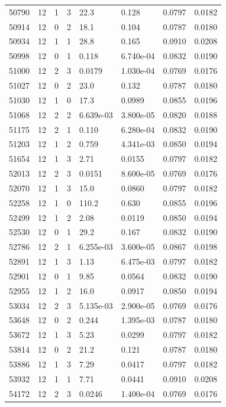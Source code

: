 \documentclass[preview]{standalone}
\begin{document}
{{{\begin{tabular}{L{1.2cm}C{1.2cm} C{0.3cm}C{0.5cm} C{1.4cm}C{1.4cm} C{1.4cm}C{1.4cm}}
  50790  &    12  & 1     &  3 &  22.3  & 0.128  & 0.0797 &  0.0182   \\ 
  50914  &    12  & 0     &  2 &  18.1  & 0.104  & 0.0787 &  0.0180   \\ 
  50934  &    12  & 1     &  1 &  28.8  & 0.165  & 0.0910 &  0.0208   \\ 
  50998  &    12  & 0     &  1 &  0.118  & 6.740e-04  & 0.0832 &  0.0190   \\ 
  51000  &    12  & 2     &  3 &  0.0179  & 1.030e-04  & 0.0769 &  0.0176   \\ 
  51027  &    12  & 0     &  2 &  23.0  & 0.132  & 0.0787 &  0.0180   \\ 
  51030  &    12  & 1     &  0 &  17.3  & 0.0989  & 0.0855 &  0.0196   \\ 
  51068  &    12  & 2     &  2 &  6.639e-03  & 3.800e-05  & 0.0820 &  0.0188   \\ 
  51175  &    12  & 2     &  1 &  0.110  & 6.280e-04  & 0.0832 &  0.0190   \\ 
  51203  &    12  & 1     &  2 &  0.759  & 4.341e-03  & 0.0850 &  0.0194   \\ 
  51654  &    12  & 1     &  3 &  2.71  & 0.0155  & 0.0797 &  0.0182   \\ 
  52013  &    12  & 2     &  3 &  0.0151  & 8.600e-05  & 0.0769 &  0.0176   \\ 
  52070  &    12  & 1     &  3 &  15.0  & 0.0860  & 0.0797 &  0.0182   \\ 
  52258  &    12  & 1     &  0 &  110.2  & 0.630  & 0.0855 &  0.0196   \\ 
  52499  &    12  & 1     &  2 &  2.08  & 0.0119  & 0.0850 &  0.0194   \\ 
  52530  &    12  & 0     &  1 &  29.2  & 0.167  & 0.0832 &  0.0190   \\ 
  52786  &    12  & 2     &  1 &  6.255e-03  & 3.600e-05  & 0.0867 &  0.0198   \\ 
  52891  &    12  & 1     &  3 &  1.13  & 6.475e-03  & 0.0797 &  0.0182   \\ 
  52901  &    12  & 0     &  1 &  9.85  & 0.0564  & 0.0832 &  0.0190   \\ 
  52955  &    12  & 1     &  2 &  16.0  & 0.0917  & 0.0850 &  0.0194   \\ 
  53034  &    12  & 2     &  3 &  5.135e-03  & 2.900e-05  & 0.0769 &  0.0176   \\ 
  53648  &    12  & 0     &  2 &  0.244  & 1.395e-03  & 0.0787 &  0.0180   \\ 
  53672  &    12  & 1     &  3 &  5.23  & 0.0299  & 0.0797 &  0.0182   \\ 
  53814  &    12  & 0     &  2 &  21.2  & 0.121  & 0.0787 &  0.0180   \\ 
  53886  &    12  & 1     &  3 &  7.29  & 0.0417  & 0.0797 &  0.0182   \\ 
  53932  &    12  & 1     &  1 &  7.71  & 0.0441  & 0.0910 &  0.0208   \\ 
  54172  &    12  & 2     &  3 &  0.0246  & 1.400e-04  & 0.0769 &  0.0176   \\ 
\hline 
\end{tabular} 

}}}
\end{document}
